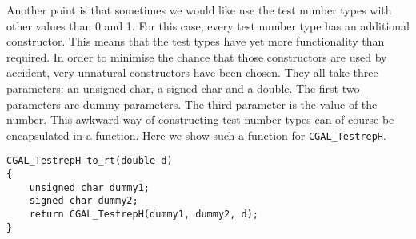 \documentclass[]{article}
\begin{document}
Another point is that sometimes we would like use the test number types with
other values than 0 and 1. For this case, every test number type has an
additional constructor. This means that the test types have yet more
functionality than required. In order to minimise the chance that those
constructors are used by accident, very unnatural constructors have been
chosen. They all take three parameters: an unsigned char, a signed char and a
double. The first two parameters are dummy parameters. The third parameter is
the value of the number. This awkward way of constructing test number types
can of course be encapsulated in a function. Here we show such a function for
\verb~CGAL_TestrepH~.
\begin{verbatim}
CGAL_TestrepH to_rt(double d)
{
    unsigned char dummy1;
    signed char dummy2;
    return CGAL_TestrepH(dummy1, dummy2, d);
}
\end{verbatim}
\end{document}
